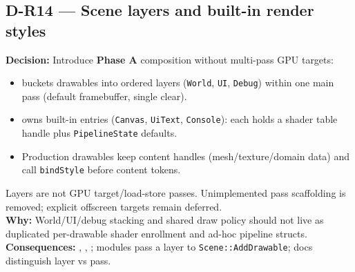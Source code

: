 \subsection*{D-R14 --- Scene layers and built-in render styles}
\begin{decisionbox}[title={D-R14 \quad 2026-08-07}]
\textbf{Decision:} Introduce \textbf{Phase A} composition without multi-pass
GPU targets:
\begin{itemize}
  \item {} buckets drawables into ordered layers
        (\texttt{World}, \texttt{UI}, \texttt{Debug}) within one main pass
        (default framebuffer, single clear).
  \item {} owns built-in  entries
        (\texttt{Canvas}, \texttt{UiText}, \texttt{Console}): each holds a
        shader table handle plus \texttt{PipelineState} defaults.
  \item Production drawables keep content handles (mesh/texture/domain data)
        and call \texttt{bindStyle} before content tokens.
\end{itemize}
Layers are not GPU target/load-store passes. Unimplemented pass scaffolding is
removed; explicit offscreen targets remain deferred.\\
\textbf{Why:} World/UI/debug stacking and shared draw policy should not live
as duplicated per-drawable shader enrollment and ad-hoc pipeline structs.\\
\textbf{Consequences:} , ,
; modules pass a layer to
\texttt{Scene::AddDrawable}; docs distinguish layer vs pass.
\end{decisionbox}

